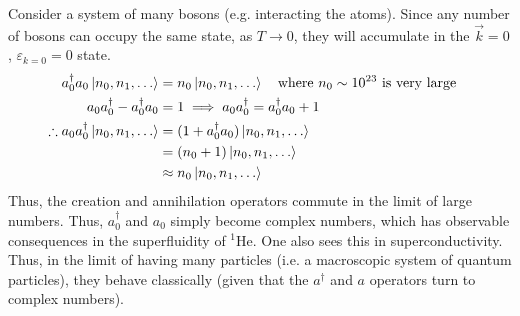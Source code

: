 \documentclass[12pt,a4paper,titlepage]{article}
\begin{document}
Consider a system of many bosons (e.g. interacting the atoms). Since any number of bosons can occupy the same state, as $T\rightarrow 0$, they will accumulate in the $\vec{k}=0$, $\varepsilon_{k=0}=0$ state.\\

\begin{equation}
\begin{aligned}
a_{0}^{\dagger}a_{0}\ket{n_{0},n_{1},\ldots}&=n_{0}\ket{n_{0},n_{1},\ldots}\qq{where $n_{0}\sim 10^{23}$ is very large}\\
a_{0}a_{0}^{\dagger}-a_{0}^{\dagger}a_{0}&=1\implies a_{0}a_{0}^{\dagger}=a_{0}^{\dagger}a_{0}+1\\
\therefore a_{0}a_{0}^{\dagger}\ket{n_{0},n_{1},\ldots}&=(1+a_{0}^{\dagger}a_{0})\ket{n_{0},n_{1},\ldots}\\
&=(n_{0}+1)\ket{n_{0},n_{1},\ldots}\\
&\approx n_{0}\ket{n_{0},n_{1},\ldots}
\end{aligned}
\end{equation}
Thus, the creation and annihilation operators commute in the limit of large numbers. Thus, $a_{0}^{\dagger}$ and $a_{0}$ simply become complex numbers, which has observable consequences in the superfluidity of ${}^{1}$He. One also sees this in superconductivity.\\

Thus, in the limit of having many particles (i.e. a macroscopic system of quantum particles), they behave classically (given that the $a^{\dagger}$ and $a$ operators turn to complex numbers).
\end{document}
